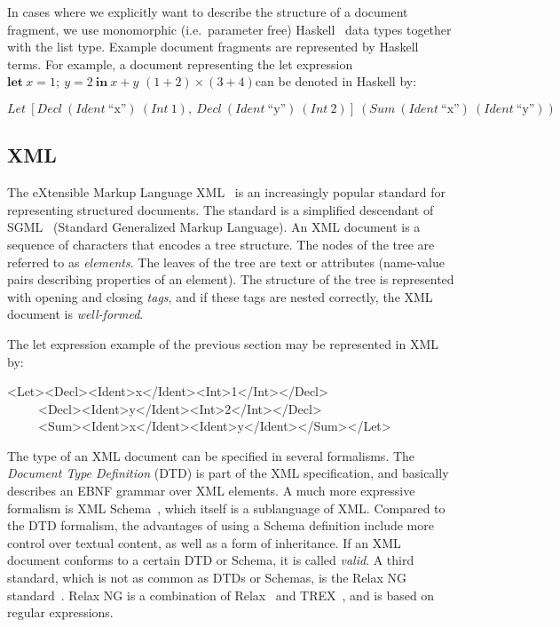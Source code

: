 In cases where we explicitly want to describe the structure of a document fragment, we use monomorphic (i.e.\ parameter free) Haskell~\cite{peytonJones03haskell} data types together with the list type. Example document fragments are represented by Haskell terms. For example, a document representing the let expression  $\mathbf{let}~x = 1;~y = 2~\mathbf{in}~x+y$
\bc $(1+2) \times (3 + 4)$\ec can be denoted in Haskell by: 

\begin{small}
$Let~[Decl~(Ident~\text{``x''})~(Int~1),~Decl~(Ident~\text{``y''})~(Int~2)]~(Sum~(Ident~\text{``x''})~(Ident~\text{``y''}))$
\end{small}

\subsection{XML}

The eXtensible Markup Language XML~\cite{xml11} is an increasingly popular standard for representing structured documents. The standard is a simplified descendant of SGML~\cite{sgml86} (Standard Generalized Markup Language). An XML document is a sequence of characters that encodes a tree structure. The nodes of the tree are referred to as {\em elements}. The leaves of the tree are text or attributes (name-value pairs describing properties of an element). The structure of the tree  is represented with opening and closing {\em tags}, and if these tags are nested correctly, the XML document is {\em well-formed}.

The let expression example of the previous section may be represented in XML by:

\ttfamily\begin{small}\begin{tabbing}
<Let><Decl><Ident>x</Ident><Int>1</Int></Decl>\\
~~~~~<Decl><Ident>y</Ident><Int>2</Int></Decl>\\
~~~~~<Sum><Ident>x</Ident><Ident>y</Ident></Sum></Let>
\end{tabbing}\end{small}\rmfamily


The type of an XML document can be specified in several formalisms. The {\em Document Type Definition} (DTD) is part of the XML specification, and basically describes an EBNF grammar over XML elements. A much more expressive formalism is XML Schema~\cite{xmlSchema1}, which itself is a sublanguage of XML. Compared to the DTD formalism, the advantages of using a Schema definition include more control over textual content, as well as a form of inheritance. If an XML document conforms to a certain DTD or Schema, it is called {\em valid}. A third standard, which is not as common as DTDs or Schemas, is the Relax NG standard~\cite{relaxNG01}. Relax NG is a combination of Relax~\cite{relax01} and TREX~\cite{trex01}, and is based on regular expressions. 


